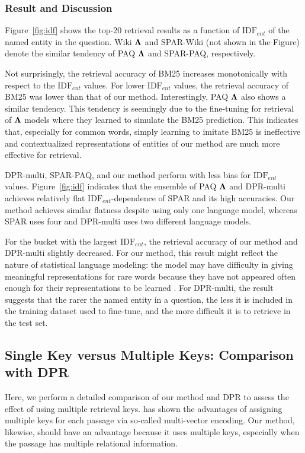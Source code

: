 \documentclass[letterpaper]{article} %
\begin{document}
\subsubsection{Result and Discussion}
Figure~\ref{fig:idf} shows the top-20 retrieval results as a function of $\mathrm{IDF}_{ent}$ of the named entity in the question.
Wiki $\bf{\Lambda}$ and SPAR-Wiki (not shown in the Figure) denote the similar tendency of PAQ $\bf{\Lambda}$ and SPAR-PAQ, respectively.

Not surprisingly, the retrieval accuracy of BM25 increases monotonically with respect to the $\mathrm{IDF}_{ent}$ values.
For lower $\mathrm{IDF}_{ent}$ values, the retrieval accuracy of BM25 was lower than that of our method.
Interestingly, PAQ $\bf{\Lambda}$ also shows a similar tendency.
This tendency is seemingly due to the fine-tuning for retrieval of $\bf{\Lambda}$ models where they learned to simulate the BM25 prediction.
This indicates that, especially for common words, simply learning to imitate BM25 is ineffective and contextualized representations of entities of our method are much more effective for retrieval.

DPR-multi, SPAR-PAQ, and our method perform with less bias for $\mathrm{IDF}_{ent}$ values.
Figure~\ref{fig:idf} indicates that the ensemble of PAQ $\bf{\Lambda}$ and DPR-multi achieves relatively flat $\mathrm{IDF}_{ent}$-dependence of SPAR and its high accuracies.
Our method achieves similar flatness despite using only one language model, whereas SPAR uses four and DPR-multi uses two different language models.

For the bucket with the largest $\mathrm{IDF}_{ent}$, the retrieval accuracy of our method and DPR-multi slightly decreased.
For our method, this result might reflect the nature of statistical language modeling: the model may have difficulty in giving meaningful representations for rare words because they have not appeared often enough for their representations to be learned \citep[e.g.,][]{match_your_words}.
For DPR-multi, the result suggests that the rarer the named entity in a question, the less it is included in the training dataset used to fine-tune, and the more difficult it is to retrieve in the test set.


\subsection{Single Key versus Multiple Keys: Comparison with DPR}\label{sec:comparison_with_dpr}
Here, we perform a detailed comparison of our method and DPR to assess the effect of using multiple retrieval keys.
\citet{luan-etal-2021-sparse} has shown the advantages of assigning multiple keys for each passage via so-called multi-vector encoding.
Our method, likewise, should have an advantage because it uses multiple keys, especially when the passage has multiple relational information.
\end{document}
